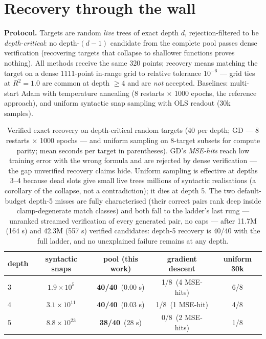 \documentclass[11pt]{article}
\begin{document}
\section{Recovery through the wall}\label{sec:recovery}

\textbf{Protocol.} Targets are random \emph{live} trees of exact
depth $d$, rejection-filtered to be \emph{depth-critical}: no
depth-$(d{-}1)$ candidate from the complete pool passes dense
verification (recovering targets that collapse to shallower functions
proves nothing). All methods receive the same 320 points; recovery
means matching the target on a dense 1111-point in-range grid to
relative tolerance $10^{-6}$ — grid ties at $R^2=1.0$ are common at
depth $\ge4$ and are \emph{not} accepted. Baselines: multi-start Adam
with temperature annealing (8 restarts $\times$ 1000 epochs, the
reference approach), and uniform syntactic snap sampling with OLS
readout (30k samples).

\begin{table}[t]
\centering\small
\begin{tabular}{lcccc}
\toprule
depth & syntactic snaps & pool (this work) & gradient descent & uniform 30k \\
\midrule
3 & $1.9\times10^{5}$  & \textbf{40/40} \,(0.00 s) & 1/8 \,(4 MSE-hits) & 6/8 \\
4 & $3.1\times10^{11}$ & \textbf{40/40} \,(0.03 s) & 1/8 \,(1 MSE-hit) & 4/8 \\
5 & $8.8\times10^{23}$ & \textbf{38/40} \,(28 s)   & 0/8 \,(2 MSE-hits) & 1/8 \\
\bottomrule
\end{tabular}
\caption{Verified exact recovery on depth-critical random targets (40
per depth; GD --- 8 restarts $\times$ 1000 epochs --- and uniform
sampling on 8-target subsets for compute parity; mean seconds per
target in parentheses). GD's \emph{MSE-hits} reach low training error
with the wrong formula and are rejected by dense verification — the
gap unverified recovery claims hide. Uniform sampling is effective at
depths 3--4 because dead slots give small live trees millions of
syntactic realisations (a corollary of the collapse, not a
contradiction); it dies at depth 5. The two default-budget depth-5 misses are fully
characterised (their correct pairs rank deep inside clamp-degenerate
match classes) and both fall to the ladder's last rung — unranked
streamed verification of every generated pair, no caps — after 11.7M
(164 s) and 42.3M (557 s) verified candidates: depth-5 recovery is
40/40 with the full ladder, and no unexplained failure remains at any
depth.}
\label{tab:recovery}
\end{table}
\end{document}
